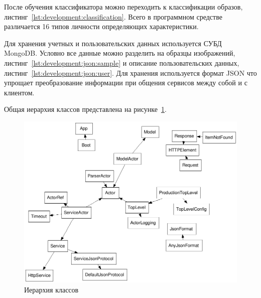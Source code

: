 После обучения классификатора можно переходить к классификации образов, листинг~\ref{lst:development:classification}. Всего в программном средстве различается 16 типов личности определяющих характеристики.



Для хранения учетных и пользовательских данных используется СУБД MongoDB. Условно все данные можно разделить на образцы изображений, листинг~\ref{lst:development:json:sample} и описание пользовательских данных, листинг~\ref{lst:development:json:user}. Для хранения используется формат JSON что упрощает преобразование информации при общения сервисов между собой и с клиентом. 





Общая иерархия классов представлена на рисунке~\ref{fig:develoipment:class_fdp}.
\begin{figure}[ht]
    \centering
    \includegraphics[width=1\textwidth]{figures/classes-fdp.png}
    \caption{Иерархия классов}
    \label{fig:develoipment:class_fdp}
\end{figure}

